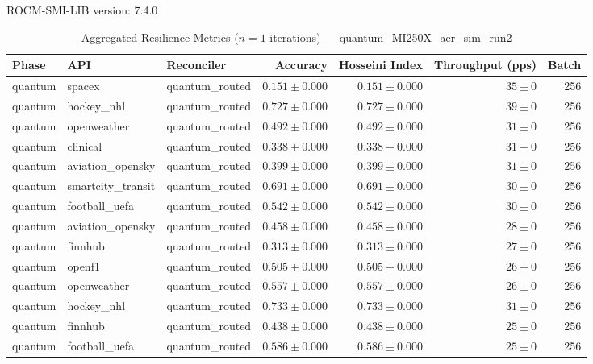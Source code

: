 ROCM-SMI-LIB version: 7.4.0

\begin{table}[htbp]
\caption{Aggregated Resilience Metrics ($n=1$ iterations) --- quantum_MI250X_aer_sim_run2}
\begin{tabular}{l l l r r r r}
\hline
Phase & API & Reconciler & Accuracy & Hosseini Index & Throughput (pps) & Batch \\
\hline
quantum & spacex & quantum\_routed & $0.151\pm0.000$ & $0.151\pm0.000$ & $35\pm0$ & 256 \\
quantum & hockey\_nhl & quantum\_routed & $0.727\pm0.000$ & $0.727\pm0.000$ & $39\pm0$ & 256 \\
quantum & openweather & quantum\_routed & $0.492\pm0.000$ & $0.492\pm0.000$ & $31\pm0$ & 256 \\
quantum & clinical & quantum\_routed & $0.338\pm0.000$ & $0.338\pm0.000$ & $31\pm0$ & 256 \\
quantum & aviation\_opensky & quantum\_routed & $0.399\pm0.000$ & $0.399\pm0.000$ & $31\pm0$ & 256 \\
quantum & smartcity\_transit & quantum\_routed & $0.691\pm0.000$ & $0.691\pm0.000$ & $30\pm0$ & 256 \\
quantum & football\_uefa & quantum\_routed & $0.542\pm0.000$ & $0.542\pm0.000$ & $30\pm0$ & 256 \\
quantum & aviation\_opensky & quantum\_routed & $0.458\pm0.000$ & $0.458\pm0.000$ & $28\pm0$ & 256 \\
quantum & finnhub & quantum\_routed & $0.313\pm0.000$ & $0.313\pm0.000$ & $27\pm0$ & 256 \\
quantum & openf1 & quantum\_routed & $0.505\pm0.000$ & $0.505\pm0.000$ & $26\pm0$ & 256 \\
quantum & openweather & quantum\_routed & $0.557\pm0.000$ & $0.557\pm0.000$ & $26\pm0$ & 256 \\
quantum & hockey\_nhl & quantum\_routed & $0.733\pm0.000$ & $0.733\pm0.000$ & $31\pm0$ & 256 \\
quantum & finnhub & quantum\_routed & $0.438\pm0.000$ & $0.438\pm0.000$ & $25\pm0$ & 256 \\
quantum & football\_uefa & quantum\_routed & $0.586\pm0.000$ & $0.586\pm0.000$ & $25\pm0$ & 256 \\

\end{tabular}
\end{table}
